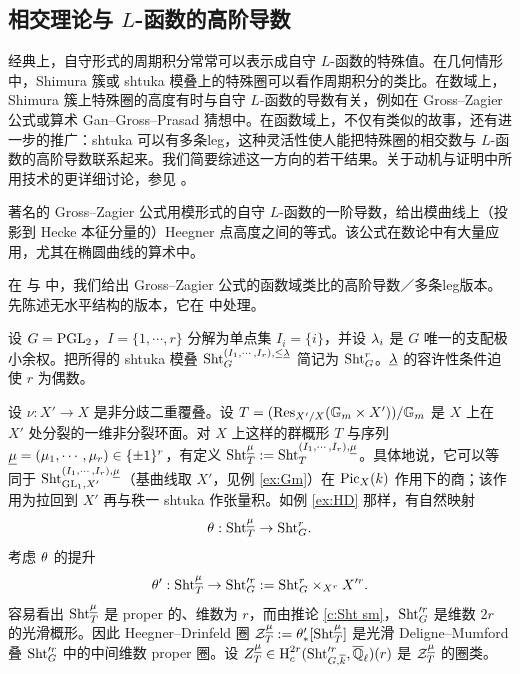 \subsection{相交理论与 $L$-函数的高阶导数}
经典上，自守形式的周期积分常常可以表示成自守 $L$-函数的特殊值。在几何情形中，Shimura 簇或 shtuka 模叠上的特殊圈可以看作周期积分的类比。在数域上，Shimura 簇上特殊圈的高度有时与自守 $L$-函数的导数有关，例如在 Gross–Zagier 公式或算术 Gan–Gross–Prasad 猜想中。在函数域上，不仅有类似的故事，还有进一步的推广：shtuka 可以有多条leg，这种灵活性使人能把特殊圈的相交数与 $L$-函数的高阶导数联系起来。我们简要综述这一方向的若干结果。关于动机与证明中所用技术的更详细讨论，参见 \cite{Y-ICM}。


著名的 Gross–Zagier 公式用模形式的自守 $L$-函数的一阶导数，给出模曲线上（投影到 Hecke 本征分量的）Heegner 点高度之间的等式。该公式在数论中有大量应用，尤其在椭圆曲线的算术中。

在 \cite{YZ1} 与 \cite{YZ2} 中，我们给出 Gross–Zagier 公式的函数域类比的高阶导数／多条leg版本。先陈述无水平结构的版本，它在 \cite{YZ1} 中处理。

设 $G=\textup{PGL}_{2}$，$I=\{1,\cdots, r\}$ 分解为单点集 $I_{i}=\{i\}$，并设 $\lambda_{i}$ 是 $G$ 唯一的支配极小余权。把所得的 shtuka 模叠 $\textup{Sht}^{(I_{1},\cdots, I_{r}),\le\underline{\lambda}}_{G}$ 简记为 $\textup{Sht}^{r}_{G}$。$\underline{\lambda}$ 的容许性条件迫使 $r$ 为偶数。

设 $\nu:X'\to X$ 是非分歧二重覆叠。设 $T=(\textup{Res}_{X'/X}(\mathbb{G}_m\times X'))/\mathbb{G}_m$ 是 $X$ 上在 $X'$ 处分裂的一维非分裂环面。对 $X$ 上这样的群概形 $T$ 与序列 $\underline\mu=(\mu_{1},\cdots, \mu_{r})\in\{\pm1\}^{r}$，有定义 $\textup{Sht}_{T}^{\underline\mu}:=\textup{Sht}_{T}^{(I_{1},\cdots, I_{r}), \underline\mu}$。具体地说，它可以等同于 $\textup{Sht}^{(I_{1},\cdots, I_{r}), \underline\mu}_{\textup{GL}_{1}, X'}$（基曲线取 $X'$，见例 \ref{ex:Gm}）在 $\textup{Pic}_{X}(k)$ 作用下的商；该作用为拉回到 $X'$ 再与秩一 shtuka 作张量积。如例 \ref{ex:HD} 那样，有自然映射
\begin{equation*}
\theta: \textup{Sht}^{\underline\mu}_{T}\to \textup{Sht}^{r}_{G}.
\end{equation*}
考虑 $\theta$ 的提升
\begin{equation*}
\theta': \textup{Sht}^{\underline\mu}_{T} \to \textup{Sht}'^{r}_{G}:=\textup{Sht}^{r}_{G}\times_{X^{r}}X'^{r}.
\end{equation*}
容易看出 $\textup{Sht}^{\underline\mu}_{T}$ 是 proper 的、维数为 $r$，而由推论 \ref{c:Sht sm}，$\textup{Sht}'^{r}_{G}$ 是维数 $2r$ 的光滑概形。因此 Heegner–Drinfeld 圈 $\mathcal{Z}^{\underline\mu}_{T}:=\theta'_{*}[\textup{Sht}^{\underline\mu}_{T}]$ 是光滑 Deligne–Mumford 叠 $\textup{Sht}'^{r}_{G}$ 中的中间维数 proper 圈。设 $Z^{\underline\mu}_{T}\in \textup{H}_{c}^{2r}({\textup{Sht}'^{r}_{G,\overline{k}},\overline{\mathbb{Q}}_\ell})(r)$ 是 $\mathcal{Z}^{\underline\mu}_{T}$ 的圈类。


